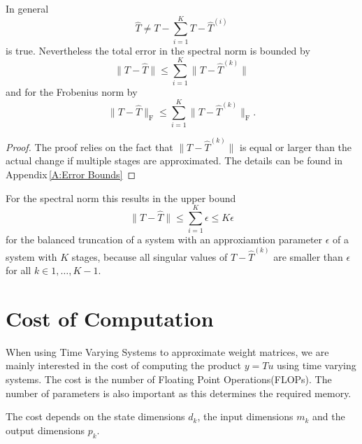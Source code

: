 \documentclass[numbers=noenddot,doctype=mastersthesis,BCOR=15mm,biblatex]{ldvbook}%
\begin{document}
In general 
\begin{equation}
	\hat{T} \neq T - \sum_{i=1}^K T-\hat{T}^{(i)}
\end{equation}
is true.
Nevertheless the total error in the spectral norm is bounded by 
\begin{equation}\label{eq:error_spectral}
	\|T-\hat{T}\| \leq \sum_{i=1}^K \|T-\hat{T}^{(k)}\|
\end{equation}
and for the Frobenius norm by
\begin{equation}\label{eq:error_frobenius}
\|T-\hat{T}\|_\text{F} \leq \sum_{i=1}^K \|T-\hat{T}^{(k)}\|_\text{F}
.
\end{equation}
\begin{proof}
	The proof relies on the fact that $\|T-\hat{T}^{(k)}\|$ is equal or larger than the actual change if multiple stages are approximated.
	The details can be found in Appendix\,\ref{A:Error Bounds}
\end{proof}


For the spectral norm this results in the upper bound 
\begin{equation}\label{eq:bound_spectral_K}
	\|T-\hat{T}\| \leq \sum_{i=1}^K \epsilon \leq K\epsilon
\end{equation}
for the balanced truncation of a system with an approxiamtion parameter $\epsilon$ of a system with $K$ stages,
because all singular values of $T-\hat{T}^{(k)}$ are smaller than $\epsilon$ for all $k \in {1,\dots,K-1}$.



\section{Cost of Computation} \label{sec:cost}
When using Time Varying Systems to approximate weight matrices, we are mainly interested in the cost of computing the product $y = Tu$ using time varying systems.
The cost is the number of Floating Point Operations(FLOPs).
The number of parameters is also important as this determines the required memory.

The cost depends on the state dimensions $d_k$, the input dimensions $m_k$ and the output dimensions $p_k$.
\end{document}
